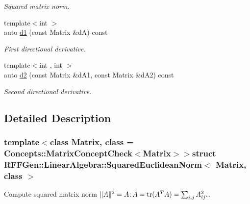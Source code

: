 \begin{DoxyCompactItemize}
\begin{DoxyCompactList}\small\item\em Squared matrix norm. \end{DoxyCompactList}\item 
\hypertarget{structRFFGen_1_1LinearAlgebra_1_1SquaredEuclideanNorm_a64dc292d1da02c39d08f379e5082cb12}{{\footnotesize template$<$int $>$ }\\auto \hyperlink{structRFFGen_1_1LinearAlgebra_1_1SquaredEuclideanNorm_a64dc292d1da02c39d08f379e5082cb12}{d1} (const Matrix \&d\-A) const }\label{structRFFGen_1_1LinearAlgebra_1_1SquaredEuclideanNorm_a64dc292d1da02c39d08f379e5082cb12}

\begin{DoxyCompactList}\small\item\em First directional derivative. \end{DoxyCompactList}\item 
\hypertarget{structRFFGen_1_1LinearAlgebra_1_1SquaredEuclideanNorm_abdff448da2b743ec46fb07127b237dbc}{{\footnotesize template$<$int , int $>$ }\\auto \hyperlink{structRFFGen_1_1LinearAlgebra_1_1SquaredEuclideanNorm_abdff448da2b743ec46fb07127b237dbc}{d2} (const Matrix \&d\-A1, const Matrix \&d\-A2) const }\label{structRFFGen_1_1LinearAlgebra_1_1SquaredEuclideanNorm_abdff448da2b743ec46fb07127b237dbc}

\begin{DoxyCompactList}\small\item\em Second directional derivative. \end{DoxyCompactList}\end{DoxyCompactItemize}


\subsection{Detailed Description}
\subsubsection*{template$<$class Matrix, class = Concepts\-::\-Matrix\-Concept\-Check$<$\-Matrix$>$$>$struct R\-F\-F\-Gen\-::\-Linear\-Algebra\-::\-Squared\-Euclidean\-Norm$<$ Matrix, class $>$}

Compute squared matrix norm $ \|A\|^2 = A\negthinspace : \negthinspace A = \mathrm{tr}(A^TA) = \sum_{i,j} A_{ij}^2. $. 

